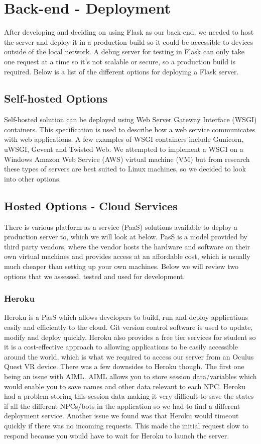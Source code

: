 \section{Back-end - Deployment}
After developing and deciding on using Flask as our back-end, we needed to host the server and deploy it in a production build so it could be accessible to devices outside of the local network. A debug server for testing in Flask can only take one request at a time so it's not scalable or secure, so a production build is required. Below is a list of the different options for deploying a Flask server.

\subsection{Self-hosted Options}
Self-hosted solution can be deployed using Web Server Gateway Interface (WSGI) containers. This specification is used to describe how a web service communicates with web applications. A few examples of WSGI containers include Gunicorn, uWSGI, Gevent and Twisted Web. We attempted to implement a WSGI on a Windows Amazon Web Service (AWS) virtual machine (VM) but from research these types of servers are best suited to Linux machines, so we decided to look into other options.

\subsection{Hosted Options - Cloud Services}
There is various platform as a service (PaaS) solutions available to deploy a production server to, which we will look at below. PasS is a model provided by third party vendors, where the vendor hosts the hardware and software on their own virtual machines and provides access at an affordable cost, which is usually much cheaper than setting up your own machines. Below we will review two options that we assessed, tested and used for development.

\subsubsection{Heroku}
Heroku is a PasS which allows developers to build, run and deploy applications easily and efficiently to the cloud. Git version control software is used to update, modify and deploy quickly. Heroku also provides a free tier services for student so it is a cost-effective approach to allowing applications to be easily accessible around the world, which is what we required to access our server from an Oculus Quest VR device. There was a few downsides to Heroku though. The first one being an issue with AIML. AIML allows you to store session data/variables which would enable you to save names and other data relevant to each NPC. Heroku had a problem storing this session data making it very difficult to save the states if all the different NPCs/bots in the application so we had to find a different deployment service. Another issue we found was that Heroku would timeout quickly if there was no incoming requests. This made the initial request slow to respond because you would have to wait for Heroku to launch the server.

